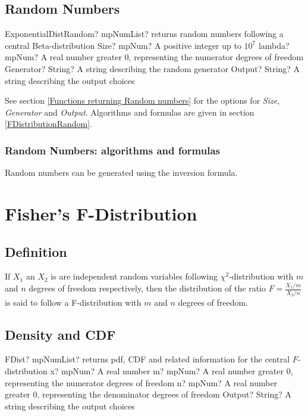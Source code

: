 \subsection{Random Numbers}

\begin{mpFunctionsExtract}
	\mpFunctionFour
	{ExponentialDistRandom? mpNumList? returns random numbers following a central Beta-distribution}
	{Size? mpNum? A positive integer up to $10^7$}
	{lambda? mpNum? A real number greater 0, representing the numerator  degrees of freedom}
	{Generator? String? A string describing the random generator}
	{Output? String? A string describing the output choices}
\end{mpFunctionsExtract}

\vspace{0.3cm}

See section \ref{Functions returning Random numbers} for the options for  {\itshape\sffamily Size},  {\itshape\sffamily Generator} and {\itshape\sffamily Output}. Algorithms and formulas are given in section \ref{FDistributionRandom}.


\subsubsection{Random Numbers: algorithms and formulas}
Random numbers can be generated using the inversion formula.




\section{Fisher's F-Distribution}
\label{FDistribution}

\subsection{Definition}
\label{FDistributionDefinition}

If $X_1$ an $X_2$ is are independent random variables  following  $\chi^2$-distribution with $m$ and $n$ degrees of freedom respectively, 
then the distribution of the ratio $F=\frac{X_1/m}{X_2/n}$ is said to follow a F-distribution with  $m$ and $n$  degrees of freedom.


\subsection{Density and CDF}

\begin{mpFunctionsExtract}
	\mpFunctionFour
	{FDist? mpNumList? returns pdf, CDF and related information for the central $F$-distribution}
	{x? mpNum? A real number}
	{m? mpNum? A real number greater 0, representing the numerator  degrees of freedom}
	{n? mpNum? A real number greater 0, representing the denominator degrees of freedom}
	{Output? String? A string describing the output choices}
\end{mpFunctionsExtract}


